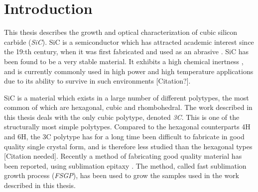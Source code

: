 
\chapter{Introduction}






This thesis describes the growth and optical characterization of cubic silicon carbide (\emph{SiC}). SiC is a semiconductor which has attracted academic interest since the 19:th century, when it was first fabricated and used as an abrasive \cite{Acheson1893}. SiC has been found to be a very stable material. It exhibits a high chemical inertness \cite{Hume1941}, and is currently commonly used in high power and high temperature applications due to its ability to survive in such environments [Citation?]. 

SiC is a material which exists in a large number of different polytypes, the most common of which are hexagonal, cubic and rhombohedral. The work described in this thesis deals with the only cubic polytype, denoted \emph{3C}. This is one of the structurally most simple polytypes. Compared to the hexagonal counterparts 4H and 6H, the 3C polytype has for a long time been difficult to fabricate in good quality single crystal form, and is therefore less studied than the hexagonal types [Citation needed]. Recently a method of fabricating good quality material has been reported, using sublimation epitaxy \cite{Jokubavicius2014}. The method, called fast sublimation growth process (\emph{FSGP}), has been used to grow the samples used in the work described in this thesis. %

